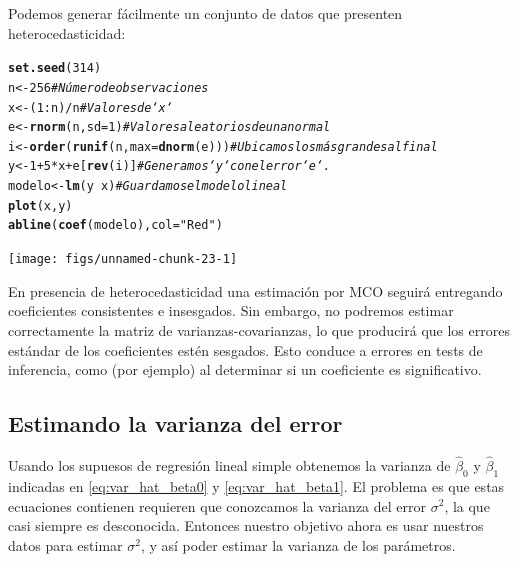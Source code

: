 \documentclass[12pt]{report}\usepackage[]{graphicx}\usepackage[]{color}
\makeatletter
\newcommand{\hlnum}[1]{\textcolor[rgb]{0.686,0.059,0.569}{#1}}%
\newcommand{\hlstr}[1]{\textcolor[rgb]{0.192,0.494,0.8}{#1}}%
\newcommand{\hlcom}[1]{\textcolor[rgb]{0.678,0.584,0.686}{\textit{#1}}}%
\newcommand{\hlopt}[1]{\textcolor[rgb]{0,0,0}{#1}}%
\newcommand{\hlstd}[1]{\textcolor[rgb]{0.345,0.345,0.345}{#1}}%
\newcommand{\hlkwb}[1]{\textcolor[rgb]{0.69,0.353,0.396}{#1}}%
\newcommand{\hlkwc}[1]{\textcolor[rgb]{0.333,0.667,0.333}{#1}}%
\newcommand{\hlkwd}[1]{\textcolor[rgb]{0.737,0.353,0.396}{\textbf{#1}}}%
\newenvironment{kframe}{%
 \def\at@end@of@kframe{}%
 \ifinner\ifhmode%
  \def\at@end@of@kframe{\end{minipage}}%
  \begin{minipage}{\columnwidth}%
 \fi\fi%
 \def\FrameCommand##1{\hskip\@totalleftmargin \hskip-\fboxsep
 \colorbox{shadecolor}{##1}\hskip-\fboxsep
     \hskip-\linewidth \hskip-\@totalleftmargin \hskip\columnwidth}%
 \MakeFramed {\advance\hsize-\width
   \@totalleftmargin\z@ \linewidth\hsize
   \@setminipage}}%
 {\par\unskip\endMakeFramed%
 \at@end@of@kframe}
\newenvironment{knitrout}{}{} %
\makeatother
\begin{document}
Podemos generar fácilmente un conjunto de datos que presenten heterocedasticidad:

\begin{knitrout}
\color{fgcolor}\begin{kframe}
\begin{alltt}
\hlkwd{set.seed}\hlstd{(}\hlnum{314}\hlstd{)}
\hlstd{n} \hlkwb{<-} \hlnum{256}                           \hlcom{# Número de observaciones}
\hlstd{x} \hlkwb{<-} \hlstd{(}\hlnum{1}\hlopt{:}\hlstd{n)}\hlopt{/}\hlstd{n}                       \hlcom{# Valores de `x`}
\hlstd{e} \hlkwb{<-} \hlkwd{rnorm}\hlstd{(n,} \hlkwc{sd}\hlstd{=}\hlnum{1}\hlstd{)}                \hlcom{# Valores aleatorios de una normal}
\hlstd{i} \hlkwb{<-} \hlkwd{order}\hlstd{(}\hlkwd{runif}\hlstd{(n,} \hlkwc{max}\hlstd{=}\hlkwd{dnorm}\hlstd{(e)))} \hlcom{# Ubicamos los más grandes al final}
\hlstd{y} \hlkwb{<-} \hlnum{1} \hlopt{+} \hlnum{5} \hlopt{*} \hlstd{x} \hlopt{+} \hlstd{e[}\hlkwd{rev}\hlstd{(i)]}         \hlcom{# Generamos `y` con el error `e`.}
\hlstd{modelo} \hlkwb{<-} \hlkwd{lm}\hlstd{(y} \hlopt{~} \hlstd{x)}                \hlcom{# Guardamos el modelo lineal}
\hlkwd{plot}\hlstd{(x, y)}
\hlkwd{abline}\hlstd{(}\hlkwd{coef}\hlstd{(modelo),} \hlkwc{col} \hlstd{=} \hlstr{"Red"}\hlstd{)}
\end{alltt}
\end{kframe}

{\centering \texttt{[image: figs/unnamed-chunk-23-1]} 

}



\end{knitrout}

En presencia de heterocedasticidad una estimación por MCO seguirá entregando coeficientes consistentes e insesgados. Sin embargo, no podremos estimar correctamente la matriz de varianzas-covarianzas, lo que producirá que los errores estándar de los coeficientes estén sesgados. Esto conduce a errores en tests de inferencia, como (por ejemplo) al determinar si un coeficiente es significativo.

\subsection{Estimando la varianza del error}

Usando los supuesos de regresión lineal simple obtenemos la varianza de $\hat\beta_0$ y $\hat\beta_1$ indicadas en \eqref{eq:var_hat_beta0} y \eqref{eq:var_hat_beta1}.
El problema es que estas ecuaciones contienen requieren que conozcamos la varianza del error $\sigma^2$, la que casi siempre es desconocida.
Entonces nuestro objetivo ahora es usar nuestros datos para estimar $\sigma^2$, y así poder estimar la varianza de los parámetros.
\end{document}
